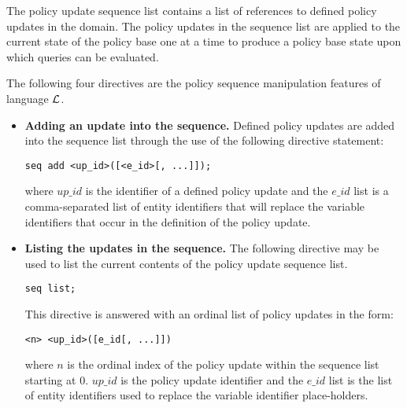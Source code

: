 \documentclass[11pt]{llncs}
\begin{document}
        The policy update sequence list contains a list of references to
        defined policy updates in the domain. The policy updates in the
        sequence list are applied to the current state of the policy base one
        at a time to produce a policy base state upon which queries can be
        evaluated.

        The following four directives are the policy sequence manipulation
        features of language $\cal{L}$.

        \begin{itemize}
          \item
            {\bf Adding an update into the sequence.} Defined policy updates
            are added into the sequence list through the use of the following
            directive statement:

            \begin{verbatim}seq add <up_id>([<e_id>[, ...]]);\end{verbatim}
                                                                              
            \noindent where $up\_id$ is the identifier of a defined policy
            update and the $e\_id$ list is a comma-separated list of entity
            identifiers that will replace the variable identifiers that occur
            in the definition of the policy update.

          \vspace{1mm}
          \item
            {\bf Listing the updates in the sequence.} The following
            directive may be used to list the current contents of the policy
            update sequence list.
                                                                              
            \begin{verbatim}seq list;\end{verbatim}
                                                                              
            This directive is answered with an ordinal list of policy
            updates in the form:
                                                                              
            \begin{verbatim}<n> <up_id>([e_id[, ...]])\end{verbatim}

            \noindent where $n$ is the ordinal index of the policy update
            within the sequence list starting at 0. $up\_id$ is the policy
            update identifier and the $e\_id$ list is the list of entity
            identifiers used to replace the variable identifier
            place-holders.


\end{itemize}
\end{document}
